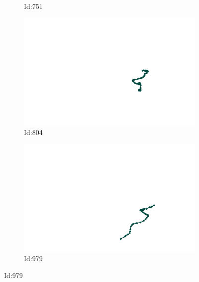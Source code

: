 \documentclass[12pt,twoside]{report}
\begin{document}
\begin{figure}
\begin{subfigure}[b]{0.20\textwidth}
\caption{Id:751}
\end{subfigure}
\begin{subfigure}[b]{0.20\textwidth}
\centering
\includegraphics[width=\textwidth]{../../trajectories/804.png}
\caption{Id:804}
\end{subfigure}
\begin{subfigure}[b]{0.20\textwidth}
\centering
\includegraphics[width=\textwidth]{../../trajectories/979.png}
\caption{Id:979}
\end{subfigure}
\end{figure}
\end{document}
